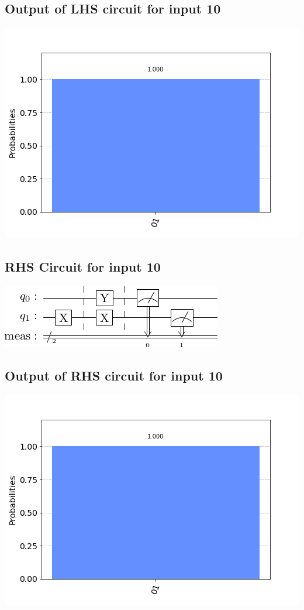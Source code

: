 \documentclass[a4paper]{article}
\begin{document}
\begin{answer}[Question 1 b (d)]
        \subsection*{Output of LHS circuit for input 10}
        \includegraphics[scale = 0.5]{d110-out.png}
        \subsection*{RHS Circuit for input 10}
        \includegraphics[scale=0.5]{d210.png}
        \subsection*{Output of RHS circuit for input 10}
        \includegraphics[scale = 0.5]{d210-out.png}

\end{answer}
\end{document}
